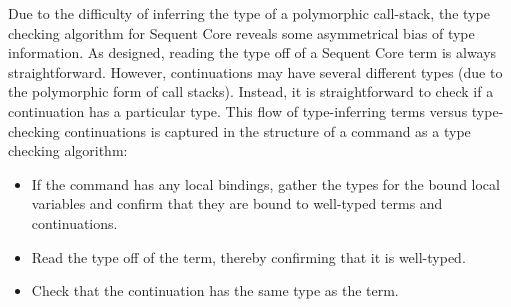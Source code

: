 \documentclass{article}
\begin{document}
Due to the difficulty of inferring the type of a polymorphic call-stack, the
type checking algorithm for Sequent Core reveals some asymmetrical bias of type
information.  As designed, reading the type off of a Sequent Core term is always
straightforward.  However, continuations may have several different types (due
to the polymorphic form of call stacks).  Instead, it is straightforward to
check if a continuation has a particular type.  This flow of type-inferring
terms versus type-checking continuations is captured in the structure of a
command as a type checking algorithm:
\begin{itemize}
\item If the command has any local bindings, gather the types for the bound
  local variables and confirm that they are bound to well-typed terms and
  continuations.
\item Read the type off of the term, thereby confirming that it is well-typed.
\item Check that the continuation has the same type as the term.
\end{itemize}
\end{document}
